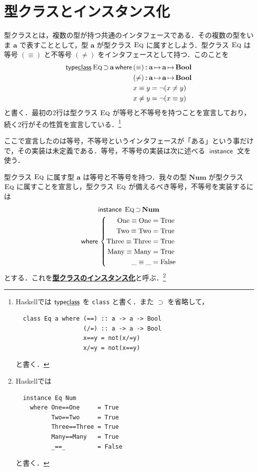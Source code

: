 \documentclass[a4paper,twocolumn]{jsbook}
\newcommand{\programminglanguage}[1]{\textsf{#1}}
\newcommand{\haskell}{\programminglanguage{Haskell}}
\newcommand{\keyword}[1]{{\underline{\textbf{#1}}}}
\newcommand{\code}[1]{\texttt{#1}}
\newcommand{\mKeyword}[1]{\mathsf{#1}} %
\newcommand{\mKeywordUnderline}[1]{\text{\underline{\textsf{#1}}}} %
\newcommand{\mInstanceKeyword}{\mKeyword{instance}}
\newcommand{\mTypeClassKeyword}{\mKeyword{type}\mKeywordUnderline{class}}
\newcommand{\mWhereKeyword}{\mKeyword{where}}
\DeclareMathOperator{\mInstance}{\mInstanceKeyword}
\DeclareMathOperator{\mSuperSet}{\supset}
\DeclareMathOperator{\mTypeClass}{\mTypeClassKeyword}
\DeclareMathOperator{\mWhere}{\mWhereKeyword}
\newcommand{\mConstant}[1]{\mathrm{#1}}
\newcommand{\mSpecialConstant}[1]{\textrm{#1}} %
\newcommand{\mFalse}{\mSpecialConstant{False}}
\newcommand{\mTrue}{\mSpecialConstant{True}}
\newcommand{\mAnyParam}{\_}
\DeclareMathOperator{\mIn}{{:\!:}}
\DeclareMathOperator{\mMapsTo}{\mapsto}
\newcommand{\mType}[1]{\mathbf{#1}}
\newcommand{\mBoolType}{\mType{Bool}}
\newcommand{\mGenericTypeClass}[1]{\textsc{#1}} %
\newcommand{\mEqTypeClass}{\mGenericTypeClass{Eq}}
\newcommand{\mProj}[2]{#1\mMapsTo#2}
\begin{document}
\section{型クラスとインスタンス化}
\label{sec:type-class-and-instance}

型クラスとは，複数の型が持つ共通のインタフェースである．その複数の型をいま $\mType{a}$ で表すこととして，型 $\mType{a}$ が型クラス $\mEqTypeClass$ に属すとしよう．型クラス $\mEqTypeClass$ は等号 $(\equiv)$ と不等号 $(\neq)$ をインタフェースとして持つ．このことを
\begin{align}
\mTypeClass\mathop{\mEqTypeClass}\mSuperSet\mType{a}\mWhere{}
&(\equiv)\mIn\mProj{\mType{a}}{\mProj{\mType{a}}{\mBoolType}}\\
&(\neq)\mIn\mProj{\mType{a}}{\mProj{\mType{a}}{\mBoolType}}\\
&x\equiv y=\neg(x\neq y)\\
&x\neq y=\neg(x\equiv y)
\end{align}
と書く．最初の2行は型クラス $\mEqTypeClass$ が等号と不等号を持つことを宣言しており，続く2行がその性質を宣言している．\footnote{\haskell では $\mTypeClass$ を \code{class} と書く．また $\mSuperSet$ を省略して，
\begin{verbatim}
  class Eq a where (==) :: a -> a -> Bool
                   (/=) :: a -> a -> Bool
                   x==y = not(x/=y)
                   x/=y = not(x==y)
\end{verbatim}
と書く．}

ここで宣言したのは等号，不等号というインタフェースが「ある」という事だけで，その実装は未定義である．等号，不等号の実装は次に述べる $\mInstance$ 文を使う．


型クラス $\mEqTypeClass$ に属す型 $\mType{a}$ は等号と不等号を持つ．我々の型 $\mType{Num}$ が型クラス $\mEqTypeClass$ に属すことを宣言し，型クラス $\mEqTypeClass$ が備えるべき等号，不等号を実装するには
\begin{multline}
\mInstance\;
\mEqTypeClass\mSuperSet\mType{Num}\\
\mWhere{}
\left\{
\begin{aligned}
\mConstant{One}\equiv\mConstant{One}&=\mTrue\\
\mConstant{Two}\equiv\mConstant{Two}&=\mTrue\\
\mConstant{Three}\equiv\mConstant{Three}&=\mTrue\\
\mConstant{Many}\equiv\mConstant{Many}&=\mTrue\\
\mAnyParam\equiv\mAnyParam&=\mFalse
\end{aligned}
\right.
\end{multline}
とする．これを\keyword{型クラスのインスタンス化}と呼ぶ．\footnote{\haskell では
\begin{verbatim}
  instance Eq Num
    where One==One     = True
          Two==Two     = True
          Three==Three = True
          Many==Many   = True
          _==_         = False
\end{verbatim}
と書く．}
\end{document}
